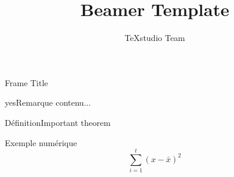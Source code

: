\documentclass{beamer}
\title{Beamer Template}
\author{TeXstudio Team}
\begin{document}
\begin{frame}[plain]
    \maketitle
\end{frame}
\begin{frame}{Frame Title}
\end{frame}

\begin{frame}
	\begin{block}{yes}{Remarque}
		contenu...
	\end{block}

\begin{alertblock}{Définition}{Important theorem} 

\end{alertblock}

\begin{exampleblock}{Exemple numérique}
\[ 
\sum_{i=1}^{t}(x-\bar{x})^2
 \]
\end{exampleblock}
\end{frame}
\end{document}
